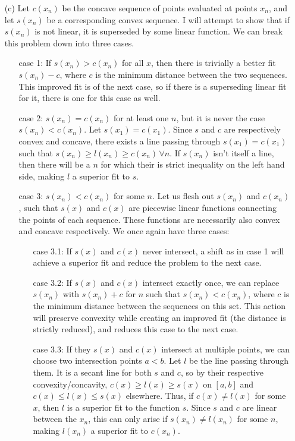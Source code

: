 \documentclass[11pt]{article}
\theoremstyle{definition}
\begin{document}
\begin{itemize}
\begin{itemize}
            \item[(c)] Let $c(x_n)$ be the concave sequence of points evaluated at points $x_n$, and let $s(x_n)$ be a corresponding convex sequence. I will attempt to show that if $s(x_n)$ is not linear, it is superseded by some linear function. We can break this problem down into three cases.
                \begin{itemize}
                    \item[case 1:] If $s(x_n)>c(x_n)$ for all $x$, then there is trivially a better fit $s(x_n)-c$, where $c$ is the minimum distance between the two sequences. This improved fit is of the next case, so if there is a superseding linear fit for it, there is one for this case as well.
                    \item[case 2:] $s(x_n)=c(x_n)$ for at least one $n$, but it is never the case $s(x_n)<c(x_n)$. Let $s(x_1)=c(x_1)$. Since $s$ and $c$ are respectively convex and concave, there exists a line passing through $s(x_1)=c(x_1)$ such that $s(x_n)\geq l(x_n) \geq c(x_n) \, \forall n$. If $s(x_n)$ isn't itself a line, then there will be a $n$ for which their is strict inequality on the left hand side, making $l$ a superior fit to $s$.
                    \item[case 3:] $s(x_n)<c(x_n)$ for some $n$. Let us flesh out $s(x_n)$ and $c(x_n)$, such that $s(x)$ and $c(x)$ are piecewise linear functions connecting the points of each sequence. These functions are necessarily also convex and concave respectively. We once again have three cases:
                        \begin{itemize}
                            \item[case 3.1:] If $s(x)$ and $c(x)$ never intersect, a shift as in case 1 will achieve a superior fit and reduce the problem to the next case.
                            \item[case 3.2:] If $s(x)$ and $c(x)$ intersect exactly once, we can replace $s(x_n)$ with $s(x_n)+c$ for $n$ such that $s(x_n)<c(x_n)$, where $c$ is the minimum distance between the sequences on this set. This action will preserve convexity while creating an improved fit (the distance is strictly reduced), and reduces this case to the next case. 
                            \item[case 3.3:] If they $s(x)$ and $c(x)$ intersect at multiple points, we can choose two intersection points $a<b$. Let $l$ be the line passing through them. It is a secant line for both $s$ and $c$, so by their respective convexity/concavity, $c(x)\geq l(x) \geq s(x)$ on $[a,b]$ and $c(x)\leq l(x) \leq s(x)$ elsewhere. Thus, if $c(x)\neq l(x)$ for some $x$, then $l$ is a superior fit to the function $s$. Since $s$ and $c$ are linear between the $x_n$, this can only arise if $s(x_n)\neq l(x_n)$ for some $n$, making $l(x_n)$ a superior fit to $c(x_n)$.


\end{itemize}
\end{itemize}
\end{itemize}
\end{itemize}
\end{document}
